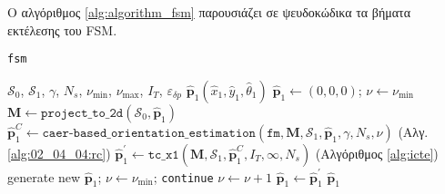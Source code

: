 



Ο αλγόριθμος \ref{alg:algorithm_fsm} παρουσιάζει σε ψευδοκώδικα τα βήματα
εκτέλεσης του FSM.

\begin{algorithm}
  \caption{\texttt{fsm}}
  \label{alg:algorithm_fsm}
  \begin{spacing}{1.2}
  \begin{algorithmic}[1]
    \REQUIRE $\mathcal{S}_0$, $\mathcal{S}_1$, $\gamma$, $N_s$, $\nu_{\min}$, $\nu_{\max}$, $I_T$, $\varepsilon_{\delta p}$
    \ENSURE $\hat{\bm{p}}_1(\hat{x}_1, \hat{y}_1, \hat{\theta}_1)$
    \STATE $\hat{\bm{p}}_1 \leftarrow (0,0,0)$; $\nu \leftarrow \nu_{\min}$
    \STATE $\bm{M} \leftarrow \texttt{project\_to\_2d}(\mathcal{S}_0, \hat{\bm{p}}_1)$
    \WHILE {$\nu \leq \nu_{\max}$}
      \STATE $\hat{\bm{p}}_1^C\leftarrow \texttt{caer-based\_orientation\_estimation}(\texttt{fm}, \bm{M}, \mathcal{S}_1, \hat{\bm{p}}_1, \gamma, N_s, \nu)$ \hfill (Αλγ. \ref{alg:02_04_04:rc})
      \STATE $\hat{\bm{p}}_1^{\prime} \leftarrow \texttt{tc\_x1}(\bm{M}, \mathcal{S}_1, \hat{\bm{p}}_1^C, I_T, \infty, N_s)$  \hfill (Αλγόριθμος \ref{alg:icte})
        \STATE generate new $\hat{\bm{p}}_1$; $\nu \leftarrow \nu_{\min}$; \texttt{continue}
      \ENDIF
        \STATE $\nu \leftarrow \nu + 1$
      \ENDIF
      \STATE $\hat{\bm{p}}_1 \leftarrow \hat{\bm{p}}_1^{\prime}$
    \ENDWHILE
    \RETURN $\hat{\bm{p}}_1$
  \end{algorithmic}
  \end{spacing}
\end{algorithm}
